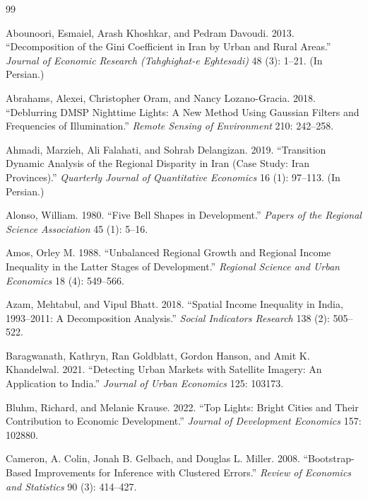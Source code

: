 \documentclass[11pt,a4paper]{article}
\begin{document}
\newpage
{}
{}
\begin{thebibliography}{99}

Abounoori, Esmaiel, Arash Khoshkar, and Pedram Davoudi. 2013. ``Decomposition of the Gini Coefficient in Iran by Urban and Rural Areas.'' \textit{Journal of Economic Research (Tahghighat-e Eghtesadi)} 48 (3): 1--21. (In Persian.)

Abrahams, Alexei, Christopher Oram, and Nancy Lozano-Gracia. 2018. ``Deblurring DMSP Nighttime Lights: A New Method Using Gaussian Filters and Frequencies of Illumination.'' \textit{Remote Sensing of Environment} 210: 242--258.

Ahmadi, Marzieh, Ali Falahati, and Sohrab Delangizan. 2019. ``Transition Dynamic Analysis of the Regional Disparity in Iran (Case Study: Iran Provinces).'' \textit{Quarterly Journal of Quantitative Economics} 16 (1): 97--113. (In Persian.)

Alonso, William. 1980. ``Five Bell Shapes in Development.'' \textit{Papers of the Regional Science Association} 45 (1): 5--16.

Amos, Orley M. 1988. ``Unbalanced Regional Growth and Regional Income Inequality in the Latter Stages of Development.'' \textit{Regional Science and Urban Economics} 18 (4): 549--566.

Azam, Mehtabul, and Vipul Bhatt. 2018. ``Spatial Income Inequality in India, 1993--2011: A Decomposition Analysis.'' \textit{Social Indicators Research} 138 (2): 505--522.

Baragwanath, Kathryn, Ran Goldblatt, Gordon Hanson, and Amit K. Khandelwal. 2021. ``Detecting Urban Markets with Satellite Imagery: An Application to India.'' \textit{Journal of Urban Economics} 125: 103173.

Bluhm, Richard, and Melanie Krause. 2022. ``Top Lights: Bright Cities and Their Contribution to Economic Development.'' \textit{Journal of Development Economics} 157: 102880.

Cameron, A. Colin, Jonah B. Gelbach, and Douglas L. Miller. 2008. ``Bootstrap-Based Improvements for Inference with Clustered Errors.'' \textit{Review of Economics and Statistics} 90 (3): 414--427.


\end{thebibliography}
\end{document}
